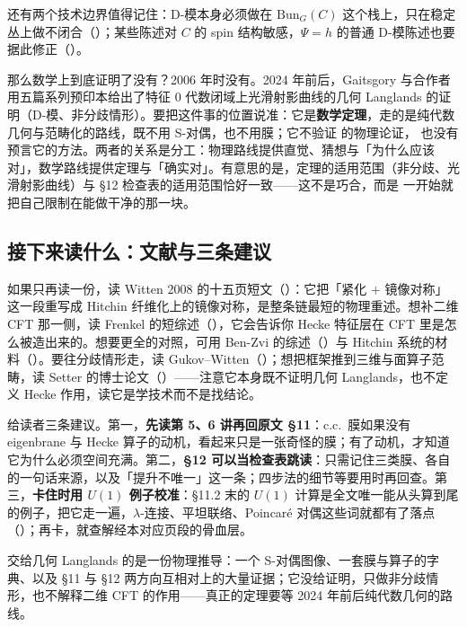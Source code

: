 还有两个技术边界值得记住：D-模本身必须做在 $\mathrm{Bun}_G(C)$ 这个栈上，只在稳定丛上做不闭合（）；某些陈述对 $C$ 的 spin 结构敏感，$\Psi=h$ 的普通 D-模陈述也要据此修正（）。

那么数学上到底证明了没有？2006 年时没有。2024 年前后，Gaitsgory 与合作者用五篇系列预印本给出了特征 $0$ 代数闭域上光滑射影曲线的几何 Langlands 的证明（D-模、非分歧情形）。要把这件事的位置说准：它是\textbf{数学定理}，走的是纯代数几何与范畴化的路线，既不用 S-对偶，也不用膜；它不验证 \kw{} 的物理论证，\kw{} 也没有预言它的方法。两者的关系是分工：物理路线提供直觉、猜想与「为什么应该对」，数学路线提供定理与「确实对」。有意思的是，定理的适用范围（非分歧、光滑射影曲线）与 \S12 检查表的适用范围恰好一致——这不是巧合，而是 \kw{} 一开始就把自己限制在能做干净的那一块。

\subsection{接下来读什么：文献与三条建议}

如果只再读一份，读 Witten 2008 的十五页短文（\cite{w08}）：它把「紧化 $+$ 镜像对称」这一段重写成 Hitchin 纤维化上的镜像对称，是整条链最短的物理重述。想补二维 CFT 那一侧，读 Frenkel 的短综述（\cite{fr09}），它会告诉你 Hecke 特征层在 CFT 里是怎么被造出来的。想要更全的对照，可用 Ben-Zvi 的综述（\cite{bz04}）与 Hitchin 系统的材料（\cite{ht03}）。要往分歧情形走，读 Gukov--Witten（\cite{gw06}）；想把框架推到三维与面算子范畴，读 Setter 的博士论文（\cite{set13}）——注意它本身既不证明几何 Langlands，也不定义 Hecke 作用，读它是学技术而不是找结论。

给读者三条建议。第一，\textbf{先读第 5、6 讲再回原文 \S11}：c.c.\ 膜如果没有 eigenbrane 与 Hecke 算子的动机，看起来只是一张奇怪的膜；有了动机，才知道它为什么必须空间充满。第二，\textbf{\S12 可以当检查表跳读}：只需记住三类膜、各自的一句话来源，以及「提升不唯一」这一条；四步法的细节等要用时再回查。第三，\textbf{卡住时用 $U(1)$ 例子校准}：\S11.2 末的 $U(1)$ 计算是全文唯一能从头算到尾的例子，把它走一遍，$\lambda$-连接、平坦联络、Poincaré 对偶这些词就都有了落点（）；再卡，就查解经本对应页段的骨血层。

\begin{keybox}
\kw{} 交给几何 Langlands 的是一份物理推导：一个 S-对偶图像、一套膜与算子的字典、以及 \S11 与 \S12 两方向互相对上的大量证据；它没给证明，只做非分歧情形，也不解释二维 CFT 的作用——真正的定理要等 2024 年前后纯代数几何的路线。
\end{keybox}


